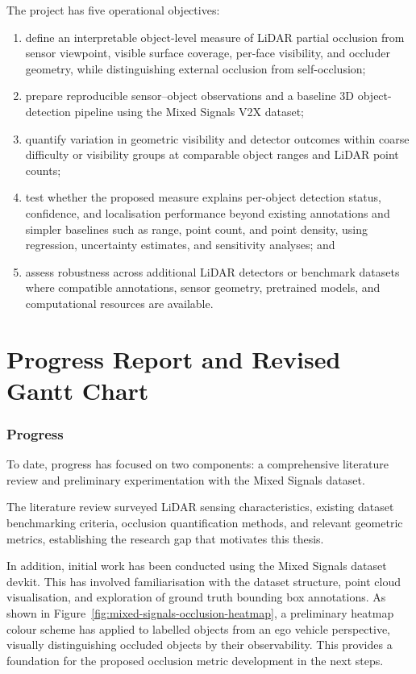 \documentclass[12pt,a4paper]{article}
\begin{document}
The project has five operational objectives:
\begin{enumerate}
    \item define an interpretable object-level measure of LiDAR partial occlusion from sensor viewpoint, visible surface coverage, per-face visibility, and occluder geometry, while distinguishing external occlusion from self-occlusion;
    \item prepare reproducible sensor--object observations and a baseline 3D object-detection pipeline using the Mixed Signals V2X dataset;
    \item quantify variation in geometric visibility and detector outcomes within coarse difficulty or visibility groups at comparable object ranges and LiDAR point counts;
    \item test whether the proposed measure explains per-object detection status, confidence, and localisation performance beyond existing annotations and simpler baselines such as range, point count, and point density, using regression, uncertainty estimates, and sensitivity analyses; and
    \item assess robustness across additional LiDAR detectors or benchmark datasets where compatible annotations, sensor geometry, pretrained models, and computational resources are available.
\end{enumerate}




\section{Progress Report and Revised Gantt Chart}

\subsubsection{Progress}

To date, progress has focused on two components: a comprehensive
literature review and preliminary experimentation with the Mixed Signals
dataset.

The literature review surveyed LiDAR sensing characteristics, existing
dataset benchmarking criteria, occlusion quantification methods, and
relevant geometric metrics, establishing the research gap that motivates
this thesis.

In addition, initial work has been conducted using the Mixed Signals
dataset devkit. This has involved familiarisation with the dataset
structure, point cloud visualisation, and exploration of ground truth
bounding box annotations. As shown in Figure~\ref{fig:mixed-signals-occlusion-heatmap}, a preliminary heatmap
colour scheme has applied to labelled objects from an ego vehicle
perspective, visually distinguishing occluded objects by their
observability. This provides a foundation for the proposed occlusion
metric development in the next steps.
\end{document}

